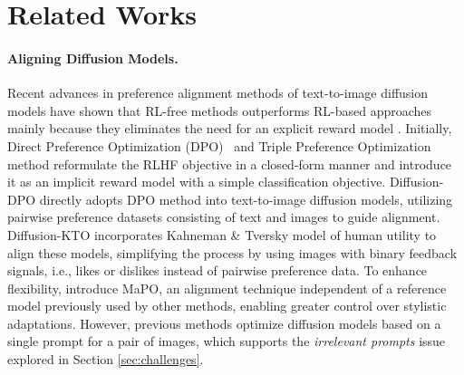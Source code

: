 \section{Related Works}

\paragraph{Aligning Diffusion Models.} Recent advances in preference alignment methods of text-to-image diffusion models have shown that RL-free methods \citep{wallace2024diffusion, yang2023using, li2024aligning, yuan2024selfplay, gambashidze2024aligningdiffusionmodelsnoiseconditioned, park2024directunlearningoptimizationrobust} outperforms RL-based approaches \citep{pmlr-v202-fan23b, fan2023dpok, hao2023optimizing,lee2023aligning,  xu2023imagerewardlearningevaluatinghuman, prabhudesai2024aligning, black2024training, clark2024directly} mainly because they eliminates the need for an explicit reward model \citep{saeidi2024insights, chatterjee2024revision}. Initially, Direct Preference Optimization (DPO)~\citep{rafailov2024direct} and Triple Preference Optimization~\citep{saeidi2024triple} method reformulate the RLHF objective in a closed-form manner and introduce it as an implicit reward model with a simple classification objective. Diffusion-DPO \citep{wallace2024diffusion}  directly adopts DPO method into text-to-image diffusion models, utilizing pairwise preference datasets consisting of text and images to guide alignment. Diffusion-KTO \citep{li2024aligning} incorporates Kahneman \& Tversky model of human utility to align these models, simplifying the process by using images with binary feedback signals, i.e., likes or dislikes instead of pairwise preference data. To enhance flexibility, \citet{hong2024marginawarepreferenceoptimizationaligning} introduce MaPO, an alignment technique independent of a reference model previously used by other methods, enabling greater control over stylistic adaptations. However, previous methods optimize diffusion models based on a single prompt for a pair of images, which supports the \textit{irrelevant prompts} issue explored in Section \ref{sec:challenges}.


